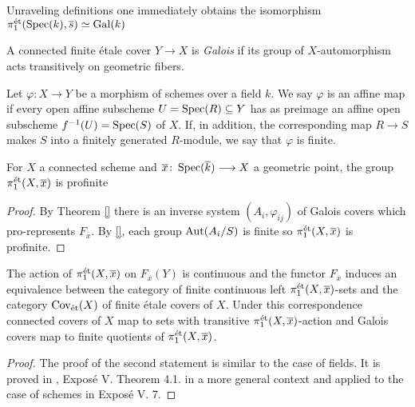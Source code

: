 \begin{remark}
	Unraveling definitions one immediately obtains the isomorphism $\pi^{\text{\'et}}_1(\operatorname{Spec}(k), \overline{s}) \simeq \operatorname{Gal}(k)$
\end{remark}

\begin{definition}
	A connected finite \'etale cover $Y \to X$ is \textit{Galois} if its group of $X$-automorphism acts transitively on geometric fibers.
\end{definition}

\begin{definition}
	Let $\varphi: X \to Y$ be a morphism of schemes over a field $k$. We say $\varphi$ is an affine map if every open affine subscheme $U = \operatorname{Spec}(R) \subseteq Y$ has as preimage an affine open subscheme $f^{-1}(U) = \operatorname{Spec}(S)$ of $X$. If, in addition, the corresponding map $R \to S$ makes $S$ into a finitely generated $R$-module, we say that $\varphi$ is finite.
\end{definition}

\begin{theorem}
	For $X$ a connected scheme and $\overline{x} \colon \operatorname{Spec}(\overline{k}) \longrightarrow X$ a geometric point, the group $\pi^{\text{\'et}}_1(X,\overline{x})$ is profinite
\end{theorem}

\begin{proof}
	By Theorem \ref{} there is an inverse system $(A_i, \varphi_{ij})$ of Galois covers which pro-represents $F_{\overline{x}}$. By \ref{}, each group $\operatorname{Aut}(A_i/S)$ is finite so $\pi^{\text{\'et}}_1(X,\overline{x})$ is profinite.
\end{proof}

\begin{theorem}
	The action of $\pi^{\text{\'et}}_1(X, \overline{x})$ on $F_{\overline{x}}(Y)$ is continuous and the functor $F_{\overline{x}}$ induces an equivalence between the category of finite continuous left $\pi^{\text{\'et}}_1(X, \overline{x})$-sets and the category $\text{Cov}_{\text{\'et}}(X)$ of finite \'etale covers of $X$. Under this correspondence connected covers of $X$ map to sets with transitive $\pi^{\text{\'et}}_1(X, \overline{x})$-action and Galois covers map to finite quotients of $\pi^{\text{\'et}}_1(X, \overline{x})$.
\end{theorem}


\begin{proof}
	The proof of the second statement is similar to the case of fields. It is proved in \cite{SGA1}, Expos\'e V. Theorem 4.1. in a more general context and applied to the case of schemes in Expos\'e V. 7.
\end{proof}

